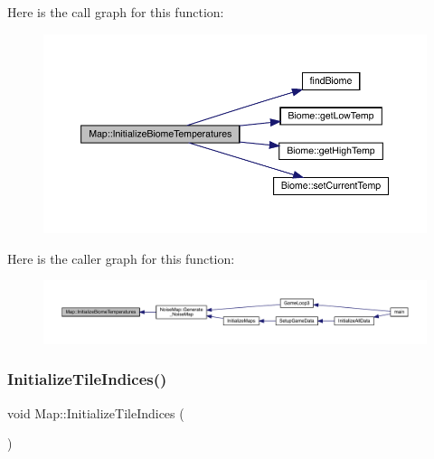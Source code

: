 Here is the call graph for this function\+:
\nopagebreak
\begin{figure}[H]
\begin{center}
\leavevmode
\includegraphics[width=350pt]{dd/d11/class_map_ae5a05885aef979310e900b8343679abd_cgraph}
\end{center}
\end{figure}
Here is the caller graph for this function\+:
\nopagebreak
\begin{figure}[H]
\begin{center}
\leavevmode
\includegraphics[width=350pt]{dd/d11/class_map_ae5a05885aef979310e900b8343679abd_icgraph}
\end{center}
\end{figure}
\mbox{\label{class_map_a5227c01512d16adc154ee48b8967e14b}} 
\subsubsection{\texorpdfstring{Initialize\+Tile\+Indices()}{InitializeTileIndices()}}
{\footnotesize\ttfamily void Map\+::\+Initialize\+Tile\+Indices (\begin{DoxyParamCaption}{ }\end{DoxyParamCaption})}

\mbox{\label{class_map_a22f7804f69757183a8b7093cf5b136ac}} 
